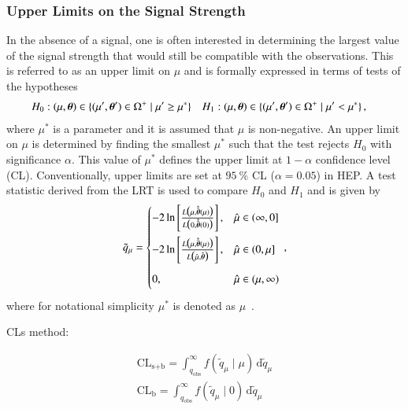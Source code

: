 \subsubsection{Upper Limits on the Signal Strength}

In the absence of a signal, one is often interested in determining the largest
value of the signal strength that would still be compatible with the
observations. This is referred to as an upper limit on $\mu$ and is formally expressed in terms of tests of the hypotheses
\begin{align*}
  &H_0: (\mu, \myvec{\theta}) \in \{ (\mu^\prime, \myvec{\theta}^\prime) \in \Omega^+ \mid \mu^\prime \geq \mu^* \}
  &&H_1: (\mu, \myvec{\theta}) \in \{ (\mu^\prime, \myvec{\theta}^\prime) \in \Omega^+ \mid \mu^\prime < \mu^* \} \,\text{,}
\end{align*}
where $\mu^*$ is a parameter and it is assumed that $\mu$ is non-negative. An
upper limit on $\mu$ is determined by finding the smallest $\mu^*$ such that the
test rejects $H_0$ with significance $\alpha$. This value of $\mu^*$ defines the
upper limit at $1 - \alpha$ confidence level (CL). Conventionally, upper limits
are set at $\SI{95}{\percent}$ CL ($\alpha = 0.05$) in HEP. A test statistic
derived from the LRT is used to compare $H_0$ and $H_1$ and is given by
\begin{align*}
  \tilde{q}_{\mu} =
  \begin{cases}
    -2\ln\left[ \frac{ L\bigl( \mu, \hat{\hat{\myvec{\theta}}}(\mu) \bigr)}{L\bigl( 0, \hat{\hat{\myvec{\theta}}}(0) \bigr)} \right], & \muhat \in (\infty, 0] \\[1em]
    -2\ln\left[ \frac{ L\bigl( \mu, \hat{\hat{\myvec{\theta}}}(\mu) \bigr)}{L\bigl( \muhat, \hat{\myvec{\theta}} \bigr)} \right], & \muhat \in (0, \mu] \\[1em]
    0,\phantom{ \biggl[  \biggr]} & \muhat \in (\mu, \infty) \\
  \end{cases} \,\text{,}
\end{align*}
where for notational simplicity $\mu^*$ is denoted as $\mu$~\cite{Cowan:2010js}.




CLs method: \cite{Read:2002hq}

\begin{align}
  \text{CL}_\text{s+b} = \int^\infty_{q_\text{obs}} f(\tilde{q}_\mu \mid \mu) \, \mathrm{d}\tilde{q}_\mu \\
  \text{CL}_\text{b} = \int^\infty_{q_\text{obs}} f(\tilde{q}_\mu \mid 0) \, \mathrm{d}\tilde{q}_\mu
\end{align}


